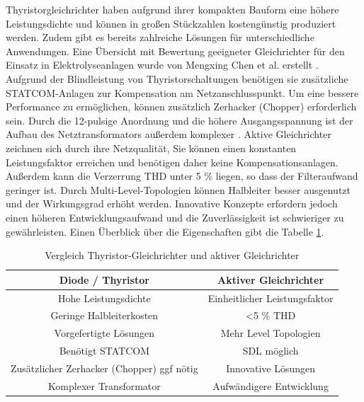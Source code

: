 Thyristorgleichrichter haben aufgrund ihrer kompakten Bauform eine höhere Leistungsdichte und können in großen Stückzahlen kostengünstig produziert werden. Zudem gibt es bereits zahlreiche Lösungen für unterschiedliche Anwendungen. Eine Übersicht mit Bewertung geeigneter Gleichrichter für den Einsatz in Elektrolyseanlagen wurde von Mengxing Chen et al. erstellt \cite{HydrogenElectronicTopologies}. Aufgrund der Blindleistung von Thyristorschaltungen benötigen sie zusätzliche STATCOM-Anlagen zur Kompensation am Netzanschlusspunkt. Um eine bessere Performance zu ermöglichen, können zusätzlich Zerhacker (Chopper) erforderlich sein. Durch die 12-pulsige Anordnung und die höhere Ausgangsspannung ist der Aufbau des Netztransformators außerdem komplexer \cite{HydrogenRectInf}. Aktive Gleichrichter zeichnen sich durch ihre Netzqualität, Sie können einen konstanten Leistungsfaktor erreichen und benötigen daher keine Kompensationsanlagen. Außerdem kann die Verzerrung \gls{THD} unter 5 \% liegen, so dass der Filteraufwand geringer ist. Durch Multi-Level-Topologien können Halbleiter besser ausgenutzt und der Wirkungsgrad erhöht werden. Innovative Konzepte erfordern jedoch einen höheren Entwicklungsaufwand und die Zuverlässigkeit ist schwieriger zu gewährleisten. Einen Überblick über die Eigenschaften gibt die Tabelle \ref{tab:thyVSafe}.\\
	\begin{table}
		\centering
		\caption{Vergleich Thyristor-Gleichrichter und aktiver Gleichrichter}
		\label{tab:thyVSafe}
		\begin{tabular}{|c|c|} 
			\hline
			\textbf{Diode / Thyristor} & \textbf{Aktiver Gleichrichter} \\
			\hline
			Hohe Leistungsdichte & Einheitlicher Leistungsfaktor \\
			\hline
			Geringe Halbleiterkosten & <5 \% \gls{THD} \\
			\hline
			Vorgefertigte Lösungen & Mehr Level Topologien  \\
			\hline
			Benötigt STATCOM &  \gls{SDL} möglich \\
			\hline
			Zusätzlicher Zerhacker (Chopper) ggf  nötig & Innovative Lösungen \\
			\hline
			Komplexer Transformator & Aufwändigere Entwicklung \\
			\hline
		\end{tabular}
	\end{table}
